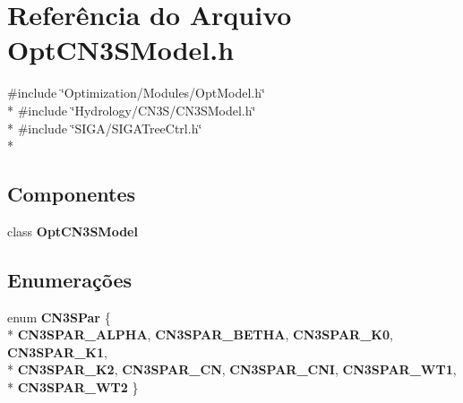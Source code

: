 \section{Referência do Arquivo Opt\+C\+N3\+S\+Model.\+h}
\label{_opt_c_n3_s_model_8h}
{\ttfamily \#include \char`\"{}Optimization/\+Modules/\+Opt\+Model.\+h\char`\"{}}\\*
{\ttfamily \#include \char`\"{}Hydrology/\+C\+N3\+S/\+C\+N3\+S\+Model.\+h\char`\"{}}\\*
{\ttfamily \#include \char`\"{}S\+I\+G\+A/\+S\+I\+G\+A\+Tree\+Ctrl.\+h\char`\"{}}\\*
\subsection*{Componentes}
\begin{DoxyCompactItemize}
\item 
class {\bf Opt\+C\+N3\+S\+Model}
\end{DoxyCompactItemize}
\subsection*{Enumerações}
\begin{DoxyCompactItemize}
\item 
enum {\bf C\+N3\+S\+Par} \{ \\*
{\bf C\+N3\+S\+P\+A\+R\+\_\+\+A\+L\+P\+HA}, 
{\bf C\+N3\+S\+P\+A\+R\+\_\+\+B\+E\+T\+HA}, 
{\bf C\+N3\+S\+P\+A\+R\+\_\+\+K0}, 
{\bf C\+N3\+S\+P\+A\+R\+\_\+\+K1}, 
\\*
{\bf C\+N3\+S\+P\+A\+R\+\_\+\+K2}, 
{\bf C\+N3\+S\+P\+A\+R\+\_\+\+CN}, 
{\bf C\+N3\+S\+P\+A\+R\+\_\+\+C\+NI}, 
{\bf C\+N3\+S\+P\+A\+R\+\_\+\+W\+T1}, 
\\*
{\bf C\+N3\+S\+P\+A\+R\+\_\+\+W\+T2}
 \}
\end{DoxyCompactItemize}
